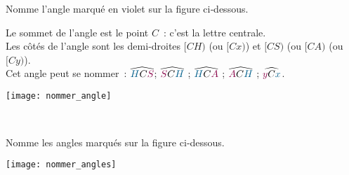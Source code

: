 \begin{methode*1}

\begin{exemple*1}
Nomme l'angle marqué en violet sur la figure ci‑dessous.  \\[0.75em]

\begin{minipage}[c]{0.70\textwidth}
Le sommet de l'angle est le point $C$ : c'est la lettre centrale. \\[0.5em]
Les côtés de l'angle sont les demi‑droites $[CH)$ (ou $[Cx)$) et $[CS)$ (ou $[CA)$ (ou $[Cy)$). \\[0.5em]
Cet angle peut se nommer : $\widehat{{\textcolor{A1}{H}}C{\textcolor{C1}{S}}}$; $\widehat{{\textcolor{C1}{S}}C{\textcolor{A1}{H}}}$ ; $\widehat{{\textcolor{A1}{H}}C{\textcolor{C1}{A}}}$ ; $\widehat{{\textcolor{C1}{A}}C{\textcolor{A1}{H}}}$ ; $\widehat{{\textcolor{C1}{y}}C{\textcolor{A1}{x}}}$.
 \end{minipage} \hfill%
 \begin{minipage}[c]{0.26\textwidth}
 \texttt{[image: nommer\_angle]}
 \end{minipage} \\
 
\end{exemple*1}

\exercice 
Nomme les angles marqués sur la figure ci‑dessous. 
\begin{center} \texttt{[image: nommer\_angles]} \end{center}
 
\end{methode*1}


